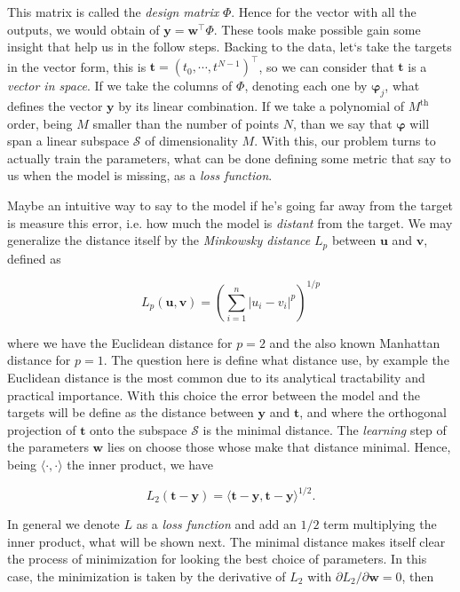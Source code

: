 \documentclass[11pt]{article} %
\begin{document}
This matrix is called the \textit{design matrix} $\Phi$. Hence for the vector with all the outputs, we would obtain of $\mathbf{y} = \mathbf{w}^\top \Phi$. These tools make possible gain some insight that help us in the follow steps. Backing to the data, let`s take the targets in the vector form, this is $\mathbf{t} = \left( t_0 , \cdots , t^{N-1} \right)^\top$, so we can consider that $\mathbf{t}$ is a \textit{vector in space}\cite{Bishop:2006:PRM:1162264}. If we take the columns of $\Phi$, denoting each one by $\boldsymbol{\varphi}_j$, what defines the vector $\mathbf{y}$ by its linear combination. If we take a polynomial of $M^\text{th}$ order, being $M$ smaller than the number of points $N$, than we say that $\boldsymbol{\varphi}$ will span a linear subspace $\mathcal{S}$ of dimensionality $M$. With this, our problem turns to actually train the parameters, what can be done defining some metric that say to us when the model is missing, as a \textit{loss function}.

Maybe an intuitive way to say to the model if he's going far away from the target is measure this error, i.e. how much the model is \textit{distant} from the target. We may generalize the distance itself by the \textit{Minkowsky distance} $L_p$ between $\mathbf{u}$ and $\mathbf{v}$, defined as

\begin{equation}
   L_p\left( \mathbf{u},\mathbf{v} \right)=\left(\sum_{i=1}^n |u_i-v_i|^p\right)^{1/p}
\end{equation}

where we have the Euclidean distance for $p=2$ and the also known Manhattan distance for $p=1$. The question here is define what distance use, by example the Euclidean distance is the most common due to its analytical tractability and practical importance. With this choice the error between the model and the targets will be define as the distance between $\mathbf{y}$ and $\mathbf{t}$, and where the orthogonal projection of $\mathbf{t}$ onto the subspace $\mathcal{S}$ is the minimal distance. The \textit{learning} step of the parameters $\mathbf{w}$ lies on choose those whose make that distance minimal. Hence, being $\langle\cdot,\cdot\rangle$ the inner product, we have

\begin{equation}
   L_2(\mathbf{t}-\mathbf{y}) = \langle \mathbf{t}-\mathbf{y},\mathbf{t}-\mathbf{y}\rangle^{1/2}.
\end{equation}

In general we denote $L$ as a \textit{loss function} and add an $1/2$ term multiplying the inner product, what will be shown next. The minimal distance makes itself clear the process of minimization for looking the best choice of parameters. In this case, the minimization is taken by the derivative of $L_2$ with $\partial L_2/ \partial \mathbf{w} = 0$, then
\end{document}

